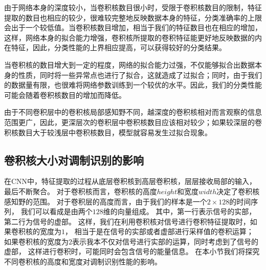 由于网络本身的深度较小，当卷积核数目很小时，受限于卷积核数目的限制，特征提取的数目也相应的较少，很难较完整地反映数据本身的特征，分类准确率的上限会出于一个较低值。当卷积核数目增加，相当于我们的特征数目也在相应的增加，这样，网络本身的拟合能力增强，卷积核所提取的卷积特征能更好地反映数据的内在特征，因此，分类性能的上界相应提高，可以获得较好的分类结果。\par
当卷积核的数目增大到一定的程度，网络的拟合能力过强，不仅能够拟合出数据本身的性质，同时将一些异常点也进行了拟合，这就造成了过拟合；同时，由于我们的数据量有限，也很难将网络参数训练到一个较优的水平。因此，我们的分类性能可能会随着卷积核数目的增加而降低。\par

由于不同卷积层中的卷积核局部感知野不同，越深度的卷积核相对而言观察的信息范围更广，因此，更深层次的卷积层中卷积核数目应该相对较少；如果较深层的卷积核数目大于较浅层中卷积核数目，模型就容易发生过拟合现象。

\subsection{卷积核大小对调制识别的影响}
在CNN中，特征提取的过程从底层卷积核到高层卷积核，层层接收局部的输入，最后不断聚合。
对于卷积核而言，卷积核的高度$height$和宽度$width$决定了卷积核感知野的范围。
对于卷积层的高度而言，由于我们的样本是一个$2\times128$的时间序列，
我们可以看成是由两个$128$维的向量组成。
其中，第一行表示信号的实部，第二行为信号的虚部。
这样，我们在利用卷积核对信号进行卷积特征提取时，如果卷积核的宽度为$1$，
相当于是在信号的实部或者虚部进行采样值的卷积运算；
如果卷积核的宽度为$2$表示我本不仅对信号进行实部的运算，同时考虑到了信号的虚部，
这样进行卷积时，可能同时会包含信号的能量信息。
在本小节我们将探究不同卷积核的高度和宽度对调制识别性能的影响。\par

